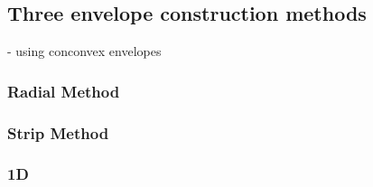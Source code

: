\subsection{Three envelope construction methods}
\noindent - using conconvex envelopes

\subsubsection{Radial Method}

\subsubsection{Strip Method}

\subsubsection{1D}